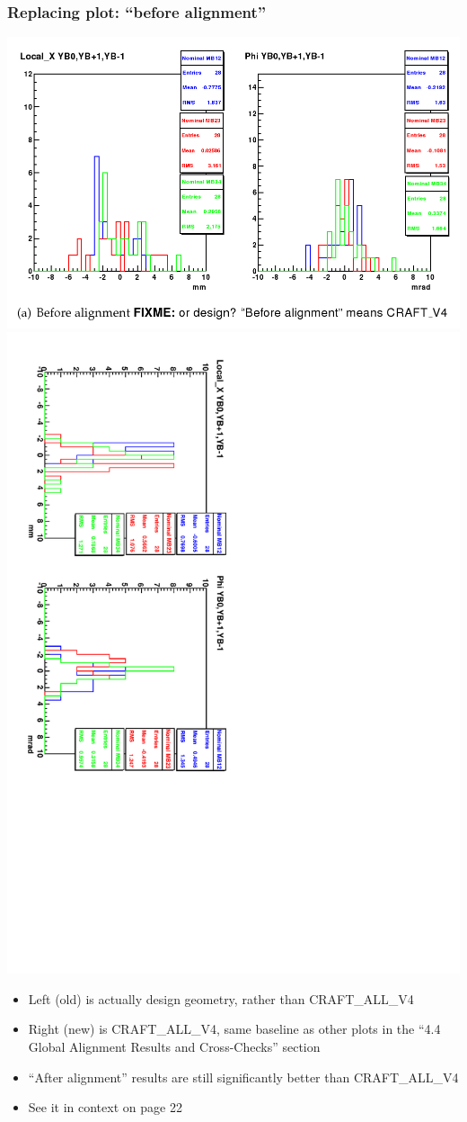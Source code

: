 \documentclass[compress]{beamer}
\begin{document}
\begin{frame}
\frametitle{Replacing plot: ``before alignment''}

\includegraphics[width=0.45\linewidth]{fixme.png} \includegraphics[height=0.55\linewidth, angle=90]{YB0YB1YBm1_V4_38T.pdf}

\vfill
\begin{itemize}
\item Left (old) is actually design geometry, rather than CRAFT\_ALL\_V4
\item Right (new) is CRAFT\_ALL\_V4, same baseline as other plots in the ``4.4 Global Alignment Results and Cross-Checks'' section
\item ``After alignment'' results are still significantly better than CRAFT\_ALL\_V4
\item See it in context on page 22
\end{itemize}
\end{frame}
\end{document}
